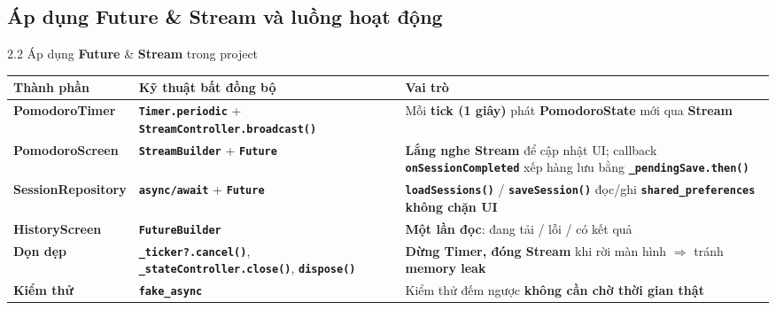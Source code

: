 \documentclass[aspectratio=169,10pt]{beamer}
\newcommand{\api}[1]{\texttt{\bfseries #1}}   %
\begin{document}
\subsection{Áp dụng Future \& Stream và luồng hoạt động}

\begin{frame}{2.2 Áp dụng \textbf{Future} \& \textbf{Stream} trong project}
  \footnotesize
  \renewcommand{\arraystretch}{1.35}
  \centering
  \begin{tabular}{@{}>{\raggedright\arraybackslash}p{2.9cm}>{\raggedright\arraybackslash}p{4.6cm}>{\raggedright\arraybackslash}p{5.8cm}@{}}
        \hline
    \rowcolor{cHead}\textbf{Thành phần} & \textbf{Kỹ thuật bất đồng bộ} & \textbf{Vai trò}\\ \hline
    \textbf{PomodoroTimer} & \api{Timer.periodic} + \api{StreamController.broadcast()} & Mỗi \textbf{tick (1 giây)} phát \textbf{PomodoroState} mới qua \textbf{Stream}\\ \hline
    \textbf{PomodoroScreen} & \api{StreamBuilder} + \api{Future} & \textbf{Lắng nghe Stream} để cập nhật UI; callback \api{onSessionCompleted} xếp hàng lưu bằng \api{\_pendingSave.then()}\\ \hline
    \textbf{SessionRepository} & \api{async/await} + \api{Future} & \api{loadSessions()} / \api{saveSession()} đọc/ghi \api{shared\_preferences} \textbf{không chặn UI}\\ \hline
    \textbf{HistoryScreen} & \api{FutureBuilder} & \textbf{Một lần đọc}: đang tải / lỗi / có kết quả\\ \hline
    \textbf{Dọn dẹp} & \api{\_ticker?.cancel()}, \api{\_stateController.close()}, \api{dispose()} & \textbf{Dừng Timer, đóng Stream} khi rời màn hình $\Rightarrow$ tránh \textbf{memory leak}\\ \hline
    \textbf{Kiểm thử} & \api{fake\_async} & Kiểm thử đếm ngược \textbf{không cần chờ thời gian thật}\\ \hline
  \end{tabular}
\end{frame}
\end{document}
